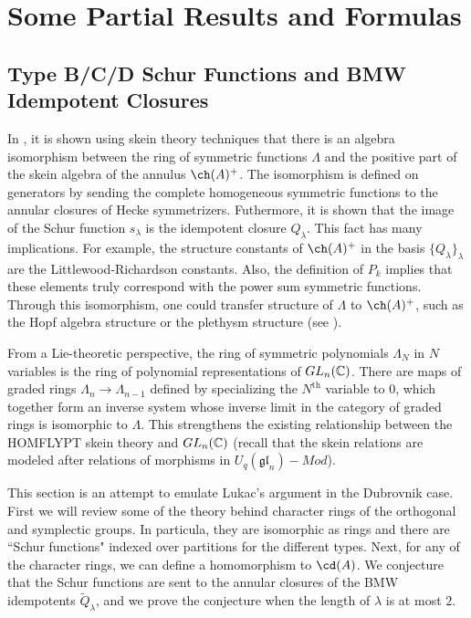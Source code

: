 \chapter{Some Partial Results and Formulas}


\section{Type B/C/D Schur Functions and BMW Idempotent Closures}
In , it is shown using skein theory techniques that there is an algebra isomorphism between the ring of symmetric functions $\Lambda$ and the positive part of the skein algebra of the annulus $\ch(A)^+$. The isomorphism is defined on generators by sending the complete homogeneous symmetric functions to the annular closures of Hecke symmetrizers. Futhermore, it is shown that the image of the Schur function $s_\lambda$ is the idempotent closure $Q_\lambda$. This fact has many implications. For example, the structure constants of $\ch(A)^+$ in the basis $\{ Q_\lambda \}_\lambda$ are the Littlewood-Richardson constants. Also, the definition of $P_k$ implies that these elements truly correspond with the power sum symmetric functions. Through this isomorphism, one could transfer structure of $\Lambda$ to $\ch(A)^+$, such as the Hopf algebra structure or the plethysm structure (see ). 

From a Lie-theoretic perspective, the ring of symmetric polynomials $\Lambda_N$ in $N$ variables is the ring of polynomial representations of $GL_n(\mathbb{C})$. There are maps of graded rings $\Lambda_n \to \Lambda_{n-1}$ defined by specializing the $N^{\mathrm{th}}$ variable to $0$, which together form an inverse system whose inverse limit in the category of graded rings is isomorphic to $\Lambda$. This strengthens the existing relationship between the HOMFLYPT skein theory and $GL_n(\mathbb{C})$ (recall that the skein relations are modeled after relations of morphisms in $U_q(\mathfrak{gl}_n)-Mod$). 

This section is an attempt to emulate Lukac's argument in the Dubrovnik case. First we will review some of the theory behind character rings of the orthogonal and symplectic groups. In particula, they are isomorphic as rings and there are ``Schur functions" indexed over partitions for the different types. Next, for any of the character rings, we can define a homomorphism to $\cd(A)$. We conjecture that the Schur functions are sent to the annular closures of the BMW idempotents $\tilde{Q}_\lambda$, and we prove the conjecture when the length of $\lambda$ is at most $2$.

